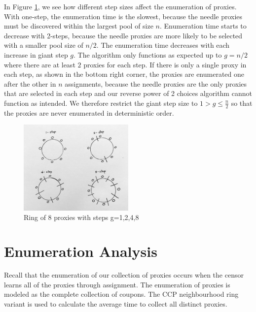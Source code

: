 In Figure \ref{fig:8ring}, we see how different step sizes affect the enumeration of proxies. With one-step, the enumeration time is the slowest, because the needle proxies must be discovered within the largest pool of size $n$. Enumeration time starts to decrease with 2-steps, because the needle proxies are more likely to be selected with a smaller pool size of $n/2$. The enumeration time decreases with each increase in giant step $g$. The algorithm only functions as expected up to $g=n/2$ where there are at least $2$ proxies for each step. If there is only a single proxy in each step, as shown in the bottom right corner, the proxies are enumerated one after the other in $n$ assignments, because the needle proxies are the only proxies that are selected in each step and our reverse power of 2 choices algorithm cannot function as intended. We therefore restrict the giant step size to $1>g\leq \frac{n}{2}$ so that the proxies are never enumerated in deterministic order.

\begin{figure}[h!]
\centering
     \includegraphics[width=0.5\textwidth]{fig/8_ring.png}
    \caption{Ring of 8 proxies with steps g=1,2,4,8}

    \label{fig:8ring}
\end{figure}
 
\section{Enumeration Analysis}

Recall that the enumeration of our collection of proxies occurs when the censor learns all of the proxies through assignment. The enumeration of proxies is modeled as the complete collection of coupons. The CCP neighbourhood ring variant is used to calculate the average time to collect all distinct proxies.
 


